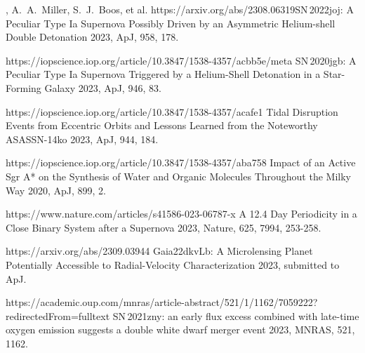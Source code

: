


\begin{cvpubs}


\cvpub
{ %
\begin{cvitems}
    \item \cvsubpub
    {\Cliu, A.~A.~Miller, S.~J.~Boos, et al.}
    {}
    {https://arxiv.org/abs/2308.06319}{SN\,2022joj: A Peculiar Type Ia Supernova Possibly Driven by an Asymmetric Helium-shell Double Detonation}
    {2023, ApJ, 958, 178.}
    \item {}
    {}
    {https://iopscience.iop.org/article/10.3847/1538-4357/acbb5e/meta}
    {SN\,2020jgb: A Peculiar Type Ia Supernova Triggered by a Helium-Shell Detonation in a Star-Forming Galaxy}
    {2023, ApJ, 946, 83.}
    \item {}
    {}
    {https://iopscience.iop.org/article/10.3847/1538-4357/acafe1}
    {Tidal Disruption Events from Eccentric Orbits and Lessons Learned from the Noteworthy ASASSN-14ko}
    {2023, ApJ, 944, 184.}
    \item {}
    {}
    {https://iopscience.iop.org/article/10.3847/1538-4357/aba758}
    {Impact of an Active Sgr A* on the Synthesis of Water and Organic Molecules Throughout the Milky Way}
    {2020, ApJ, 899, 2.}
    \item {} 
    {\Cliu}
    {https://www.nature.com/articles/s41586-023-06787-x}
    {A 12.4 Day Periodicity in a Close Binary System after a Supernova}
    {2023, Nature, 625, 7994, 253-258.}
    \item {} 
    {\Cliu}
    {https://arxiv.org/abs/2309.03944}
    {Gaia22dkvLb: A Microlensing Planet Potentially Accessible to Radial-Velocity Characterization}
    {2023, submitted to ApJ.}
    \item {} 
    {\Cliu}
    {https://academic.oup.com/mnras/article-abstract/521/1/1162/7059222?redirectedFrom=fulltext}
    {SN\,2021zny: an early flux excess combined with late-time oxygen emission suggests a double white dwarf merger event}
    {2023, MNRAS, 521, 1162.}
\end{cvitems}
}


\end{cvpubs}


